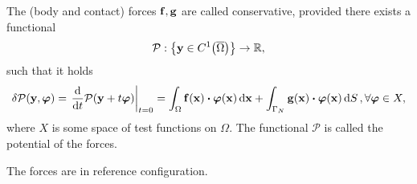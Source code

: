 \documentclass[11pt]{scrartcl} %
\begin{document}
\begin{definition}
    The (body and contact) forces $\vb{f}, \vb{g}$ are called conservative, provided there exists a functional
    \[
	    \mathcal{P}: \qty{\vb{y} \in C^1\qty(\overline{\Omega})} \to {\mathbb R},
    \]
    such that it holds
    \[
	    \delta \mathcal{P}\qty(\vb{y}, \vb*{\varphi}) = \eval{\dv{t} \mathcal{P}\qty(\vb{y} + t \vb*{\varphi})}_{t=0} = \int_{\Omega}\vb{f}\qty(\vb{x}) \vdot \vb*{\varphi}\qty(\vb{x})\dd{\vb{x}} + \int_{\Gamma_N}\vb{g}\qty(\vb{x}) \vdot \vb*{\varphi}\qty(\vb{x})\dd{S}, \forall \vb*{\varphi} \in X,
    \]
    where $X$ is some space of test functions on $\Omega$. The functional $\mathcal{P}$ is called the potential of the forces.
    \end{definition}
    \begin{remark}
        The forces are in reference configuration.
    \end{remark}
\end{document}
